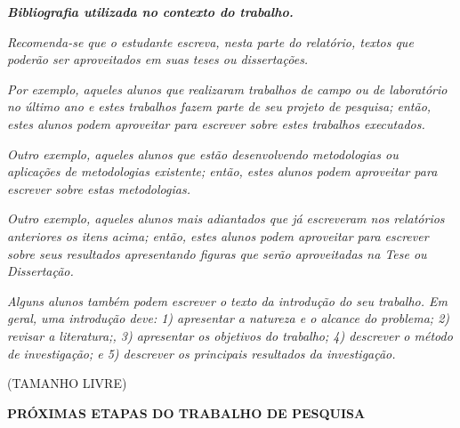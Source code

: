 \documentclass[12pt,a4paper]{article}
\begin{document}
\bigskip

{\centering\bfseries\itshape
Bibliografia utilizada no contexto do trabalho.
\par}

\bigskip

\bigskip

{\itshape
Recomenda-se que o estudante escreva, nesta parte do relatório, textos que
poderão ser aproveitados em suas teses ou dissertações.}

\bigskip

{\itshape
Por exemplo, aqueles alunos que realizaram trabalhos de campo ou de laboratório
no último ano e estes trabalhos fazem parte de seu projeto de pesquisa; então,
estes alunos podem aproveitar para escrever sobre estes trabalhos executados.}

\bigskip

{\itshape
Outro exemplo, aqueles alunos que estão desenvolvendo metodologias ou
aplicações de metodologias existente; então, estes alunos podem aproveitar
para escrever sobre estas metodologias.}

\bigskip

{\itshape
Outro exemplo, aqueles alunos mais adiantados que já escreveram nos relatórios
anteriores os itens acima; então, estes alunos podem aproveitar para escrever
sobre seus resultados apresentando figuras que serão aproveitadas na Tese ou
Dissertação.}

\bigskip

{\itshape
Alguns alunos também podem escrever o texto da introdução do seu trabalho. Em
geral, uma introdução deve: 1) apresentar a natureza e o alcance do problema;
2) revisar a literatura;, 3) apresentar os objetivos do trabalho; 4) descrever
o método de investigação; e 5) descrever os principais resultados da
investigação.}

\vspace{1.5cm}

{\centering
(TAMANHO LIVRE)
\par}

\newpage

\begin{center}
\textbf{\large PRÓXIMAS ETAPAS DO TRABALHO DE PESQUISA}
\end{center}

\vspace{1cm}
\end{document}
